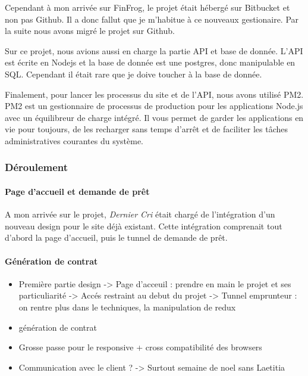 \bigskip

Cependant à mon arrivée sur FinFrog, le projet était hébergé sur
Bitbucket et non pas Github. Il a donc fallut que je m'habitue à ce
nouveaux gestionaire. Par la suite nous avons migré le projet sur
Github.

\bigskip

Sur ce projet, nous avions aussi en charge la partie API et base de
donnée. L'API est écrite en Nodejs et la base de donnée est une
postgres, donc manipulable en SQL. Cependant il était rare que je doive
toucher à la base de donnée.

\bigskip

Finalement, pour lancer les processus du site et de l'API, nous avons
utilisé PM2. PM2 est un gestionnaire de processus de production pour les
applications Node.js avec un équilibreur de charge intégré. Il vous
permet de garder les applications en vie pour toujours, de les recharger
sans temps d'arrêt et de faciliter les tâches administratives courantes
du système.

\bigskip

\subsubsection{Déroulement}\label{duxe9roulement-1}

\paragraph{Page d'accueil et demande de
prêt}\label{page-daccueil-et-demande-de-pruxeat}

\bigskip

A mon arrivée sur le projet, \emph{Dernier Cri} était chargé de
l'intégration d'un nouveau design pour le site déjà existant. Cette
intégration comprenait tout d'abord la page d'accueil, puis le tunnel de
demande de prêt.

\bigskip

\bigskip

\paragraph{Génération de contrat}\label{guxe9nuxe9ration-de-contrat}

\bigskip

\bigskip

\begin{itemize}
\item
  Première partie design -\textgreater{} Page d'acceuil : prendre en
  main le projet et ses particuliarité -\textgreater{} Accés restraint
  au debut du projet -\textgreater{} Tunnel emprunteur : on rentre plus
  dans le techniques, la manipulation de redux
\item
  génération de contrat
\item
  Grosse passe pour le responsive + cross compatibilité des browsers
\item
  Communication avec le client ? -\textgreater{} Surtout semaine de noel
  sans Laetitia
\end{itemize}

